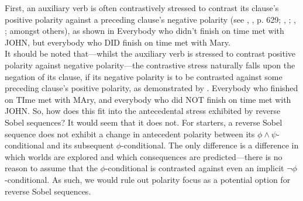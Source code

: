 First, an auxiliary verb is often contrastively stressed to contrast its clause's positive polarity against a preceding clause's negative polarity (see \citeauthor{Romero2004}, \citeyear{Romero2004}, p. 629; \citeauthor{Grimshaw2013}, \citeyear{Grimshaw2013}; \citeauthor{Wilder2013}, \citeyear{Wilder2013}; amongst others), as shown in 
\ex
Everybody who didn't finish on time met with \MakeUppercase{John}, but everybody who \MakeUppercase{did} finish on {ti}me met with {Ma}ry.\\\emptyfill\parencite[adapted from][p.~630]{Romero2004}
\xe
It should be noted that---whilst the auxiliary verb is stressed to contrast positive polarity against negative polarity---the contrastive stress naturally falls upon the negation of its clause, if its negative polarity is to be contrasted against some preceding clause's positive polarity, as demonstrated by .
\ex
Everybody who finished on \MakeUppercase{ti}me met with \MakeUppercase{Ma}ry, and everybody who did \MakeUppercase{not} finish on time met with \MakeUppercase{John}.\hfill\parencite[p.~630]{Romero2004}
\xe
So, how does this fit into the antecedental stress exhibited by reverse Sobel sequences? It would seem that it does not. For starters, a reverse Sobel sequence does not exhibit a change in antecedent polarity between its $\phi\land\psi$-conditional and its subsequent $\phi$-conditional. The only difference is a difference in which worlds are explored and which consequences are predicted---there is no reason to assume that the $\phi$-conditional is contrasted against even an implicit $\neg\phi$-conditional. As such, we would rule out polarity focus as a potential option for reverse Sobel sequences.

